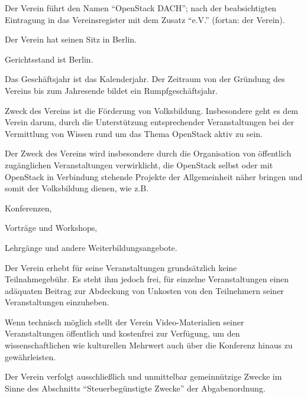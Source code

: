 \documentclass[draft]{scrartcl}
\newcommand{\VereinsName}{OpenStack DACH}
\begin{document}
\pagebreak
\ihead{\footnotesize \thetitle}
\begin{contract}


Der Verein führt den Namen "`\VereinsName"'; nach der beabsichtigten
Eintragung in das Vereinsregister mit dem Zusatz "`e.V."' (fortan: der
Verein).

Der Verein hat seinen Sitz in Berlin.

Gerichtsstand ist Berlin.

Das Geschäftsjahr ist das Kalenderjahr. Der Zeitraum von der Gründung des
Vereins bis zum Jahresende bildet ein Rumpfgeschäftsjahr.


\parnumberfalse

\label{Zweck}
Zweck des Vereins ist die Förderung von Volksbildung. Insbesondere geht es
dem Verein darum, durch die Unterstützung entsprechender Veranstaltungen
bei der Vermittlung von Wissen rund um das Thema OpenStack aktiv zu sein.

Der Zweck des Vereins wird insbesondere durch die Organisation von öffentlich
zu\-gäng\-li\-chen Veranstaltungen verwirklicht, die OpenStack selbst oder
mit OpenStack in Verbindung stehende Projekte der Allgemeinheit näher
bringen und somit der Volksbildung dienen, wie z.B.

\begin{compactitem}
  \item Konferenzen,
  \item Vorträge und Workshops,
  \item Lehrgänge und andere Weiterbildungsangebote.
\end{compactitem}

Der Verein erhebt für seine Veranstaltungen grundsätzlich keine Teilnahmegebühr.
Es steht ihm jedoch frei, für einzelne Veranstaltungen einen adäquaten Beitrag zur
Abdeckung von Unkosten von den Teilnehmern seiner Veranstaltungen einzuheben.

Wenn technisch möglich stellt der Verein Video-Materialien seiner Veranstaltungen
öf\-fent\-lich und kostenfrei zur Verfügung, um den wissenschaftlichen wie kulturellen
Mehrwert auch über die Konferenz hinaus zu gewährleisten.

\label{Gemeinnuetzigkeit}

Der Verein verfolgt ausschließlich und unmittelbar gemeinnützige Zwecke im
Sinne des Abschnitts "`Steuerbegünstigte Zwecke"' der Abgabenordnung.


\end{contract}
\end{document}
